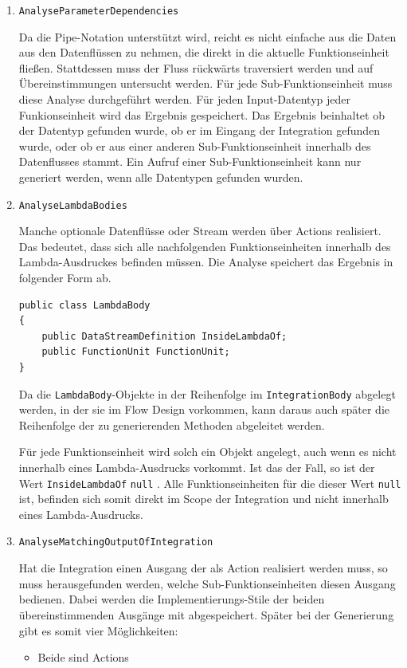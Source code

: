 	\begin{enumerate}
		\item \texttt{AnalyseParameterDependencies}

		Da die Pipe-Notation unterstützt wird, reicht es nicht einfache aus die Daten
		aus den Datenflüssen zu nehmen, die direkt in die aktuelle
		Funktionseinheit fließen. Stattdessen muss der Fluss rückwärts
		traversiert werden und auf Übereinstimmungen untersucht werden.
		Für jede Sub-Funktionseinheit muss diese Analyse durchgeführt werden.
		Für jeden Input-Datentyp jeder Funkionseinheit wird das Ergebnis gespeichert.
		Das Ergebnis beinhaltet ob der Datentyp gefunden
		wurde, ob er im Eingang der Integration gefunden wurde, oder ob er aus einer
		anderen Sub-Funktionseinheit innerhalb des Datenflusses stammt. 
		Ein Aufruf einer Sub-Funktionseinheit kann nur generiert werden, wenn alle Datentypen gefunden
		wurden.
		
		\item \texttt{AnalyseLambdaBodies}

		Manche optionale Datenflüsse oder Stream werden über Actions realisiert.
		Das bedeutet, dass sich alle nachfolgenden Funktionseinheiten innerhalb
		des Lambda-Ausdruckes befinden müssen. Die Analyse speichert das Ergebnis
		in folgender Form ab. 
		
		\begin{lstlisting}[caption=LambdaBody Klasse]
public class LambdaBody
{
	public DataStreamDefinition InsideLambdaOf;
	public FunctionUnit FunctionUnit;
}
		\end{lstlisting}
		
		Da die \texttt{LambdaBody}-Objekte in der Reihenfolge im \texttt{IntegrationBody} abgelegt
		werden, in der sie im Flow Design vorkommen, kann daraus auch später die
		Reihenfolge der zu generierenden Methoden abgeleitet werden.
		
		
		Für jede Funktionseinheit wird solch ein Objekt angelegt, auch wenn es
		nicht innerhalb eines Lambda-Ausdrucks vorkommt. Ist das der Fall, so ist der Wert
		\texttt{InsideLambdaOf} \texttt{null} . Alle Funktionseinheiten für die dieser Wert
		\texttt{null} ist, befinden sich somit direkt im Scope der Integration und nicht
		innerhalb eines Lambda-Ausdrucks.
		
		\item \texttt{AnalyseMatchingOutputOfIntegration}

		Hat die Integration einen Ausgang der als Action realisiert werden muss, so
		muss herausgefunden werden, welche Sub-Funktionseinheiten diesen
		Ausgang bedienen. Dabei werden die Implementierungs-Stile der
		beiden übereinstimmenden Ausgänge mit abgespeichert. Später bei der
		Generierung gibt es somit vier Möglichkeiten:
		\begin{itemize}
			\item Beide sind Actions
			

\end{itemize}
\end{enumerate}
